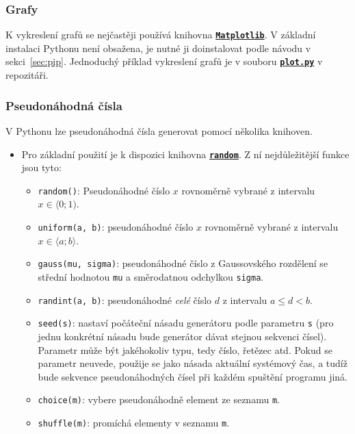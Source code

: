 \documentclass[a4paper,11pt,twoside]{article}
\def\code#1{\textnormal{\texttt{#1}}}
\def\file#1{\textnormal{\textbf{\texttt{#1}}}}
\def\ghfile#1#2{\textnormal{\textbf{\texttt{\href{https://github.com/PavelStransky/PCInPhysics/blob/main/#1#2}{#2}}}}}
\theoremstyle{red}
\theoremstyle{green}
\begin{document}
\subsubsection{Grafy}
    K vykreslení grafů se nejčastěji používá knihovna \file{\href{https://matplotlib.org}{Matplotlib}}.
    V základní instalaci Pythonu není obsažena, je nutné ji doinstalovat podle návodu v sekci~\ref{sec:pip}.
    Jednoduchý příklad vykreslení grafů je v souboru \ghfile{python/basics/}{plot.py} v repozitáři.

\subsubsection{Pseudonáhodná čísla}\label{sec:PseudonahodnaCisla}
    V Pythonu lze pseudonáhodná čísla generovat pomocí několika knihoven.
    \begin{itemize}
        \item 
            Pro základní použití je k dispozici knihovna \file{\href{https://docs.python.org/3/library/random.html}{random}}.
            Z ní nejdůležitější funkce jsou tyto:
            \begin{itemize}
                \item \code{random()}: Pseudonáhodné číslo $x$ rovnoměrně vybrané z intervalu $x\in\langle 0;1)$.
                \item \code{uniform(a, b)}: pseudonáhodné číslo $x$ rovnoměrně vybrané z intervalu $x\in\langle a;b\rangle$.
                \item \code{gauss(mu, sigma)}: pseudonáhodné číslo z Gaussovského rozdělení se střední hodnotou \code{mu} a směrodatnou odchylkou \code{sigma}. 
                \item \code{randint(a, b)}: pseudonáhodné \emph{celé} číslo $d$ z intervalu $a\leq d<b$.
                \item \code{seed(s)}: nastaví počáteční násadu generátoru podle parametru \code{s} (pro jednu konkrétní násadu bude generátor dávat stejnou sekvenci čísel). 
                Parametr může být jakéhokoliv typu, tedy číslo, řetězec atd. 
                Pokud se parametr neuvede, použije se jako násada aktuální systémový čas, a tudíž bude sekvence pseudonáhodných čísel při každém spuštění programu jiná.
                \item \code{choice(m)}: vybere pseudonáhodně element ze seznamu \code{m}.
                \item \code{shuffle(m)}: promíchá elementy v seznamu \code{m}.
            \end{itemize}


\end{itemize}
\end{document}
